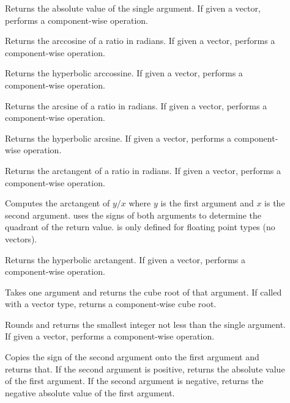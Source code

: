\begin{description}
\item[]  Returns the absolute value of
  the single argument. If given a vector, performs a component-wise
  operation.
\item[]   Returns the
  arccosine of a ratio in radians. If given a vector, performs a
  component-wise operation.
\item[]  
  Returns the hyperbolic arccossine. If given a vector, performs a
  component-wise operation.
\item[]   Returns the
  arcsine of a ratio in radians. If given a vector, performs a
  component-wise operation.
\item[]  
  Returns the hyperbolic arcsine. If given a vector, performs a
  component-wise operation.
\item[]   Returns the
  arctangent of a ratio in radians. If given a vector, performs a
  component-wise operation.
\item[] Computes the arctangent of $y/x$ where $y$ is the
  first argument and $x$ is the second argument. 
  uses the signs of both arguments to determine the quadrant of the return
  value.  is only defined for floating point types
  (no vectors).
\item[]  
  Returns the hyperbolic arctangent. If given a vector, performs a
  component-wise operation.
\item[]  Takes one argument and returns the
  cube root of that argument. If called with a vector type, returns a
  component-wise cube root.
\item[]   Rounds
  and returns the smallest integer not less than the single argument. If
  given a vector, performs a component-wise operation.
\item[] Copies the sign of the second argument onto the
  first argument and returns that. If the second argument is positive,
  returns the absolute value of the first argument. If the second argument
  is negative, returns the negative absolute value of the first argument.

\end{description}

